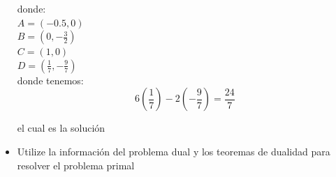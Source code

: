 \begin{itemize}
        donde:\\
        
            $A=(-0.5,0)$\\
            
            $B=(0,-\frac{3}{2})$\\
            
            $C=(1,0)$\\
            
            $D=(\frac{1}{7},-\frac{9}{7})$\\

            donde tenemos:
            $$6\left(\frac{1}{7}\right)-2\left(-\frac{9}{7}\right)=\frac{24}{7}$$
                       
            el cual es la soluci\'on
            
        \item Utilize la informaci\'on del problema dual y los teoremas de dualidad para resolver el problema primal
    
    
    \end{itemize}
